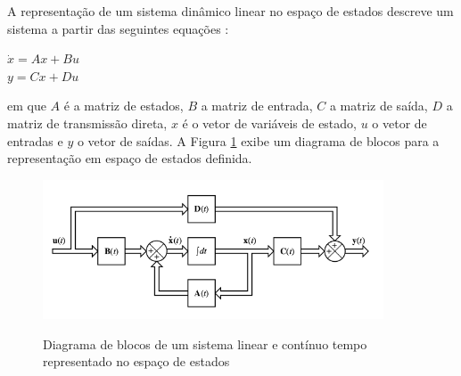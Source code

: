 A representação de um sistema dinâmico linear no espaço de estados descreve um sistema a partir das seguintes equações :
\begin{center}\label{eq:k1}
$\dot{x}=Ax+Bu$ \\
$y=Cx+Du$
\end{center}
em que $A$ é a matriz de estados, $B$ a matriz de entrada, $C$ a matriz de saída, $D$ a matriz de transmissão direta, $x$ é o vetor de variáveis de estado, $u$ o vetor de entradas e $y$ o vetor de saídas. A Figura \ref{fig:ss_diagram} exibe um diagrama de blocos para a representação em espaço de estados definida.

\begin{figure}[!htb]
    \centering
    \caption{Diagrama de blocos de um sistema linear e contínuo tempo representado no espaço de estados}
    \includegraphics[width=0.9\textwidth]{./04-figuras/fund_teorica/ss_diagram}
    \label{fig:ss_diagram}
\end{figure}


